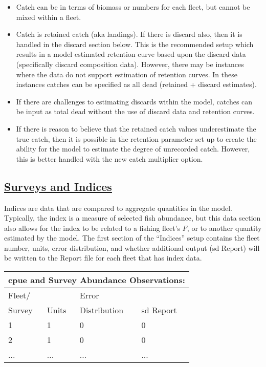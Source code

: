 \begin{itemize}
	\item Catch can be in terms of biomass or numbers for each fleet, but cannot be mixed within a fleet.
	\item Catch is retained catch (aka landings). If there is discard also, then it is handled in the discard section below. This is the recommended setup which results in a model estimated retention curve based upon the discard data (specifically discard composition data). However, there may be instances where the data do not support estimation of retention curves. In these instances catches can be specified as all dead (retained + discard estimates).
	\item If there are challenges to estimating discards within the model, catches can be input as total dead without the use of discard data and retention curves.
	\item If there is reason to believe that the retained catch values underestimate the true catch, then it is possible in the retention parameter set up to create the ability for the model to estimate the degree of unrecorded catch. However, this is better handled with the new catch multiplier option.
\end{itemize}

\hypertarget{SurveysIndices}{}
\subsection[Surveys and Indices]{\protect\hyperlink{SurveysIndices}{Surveys and Indices}}
Indices are data that are compared to aggregate quantities in the model. Typically, the index is a measure of selected fish abundance, but this data section also allows for the index to be related to a fishing fleet's $F$, or to another quantity estimated by the model. The first section of the ``Indices'' setup contains the fleet number, units, error distribution, and whether additional output (\gls{sd} Report) will be written to the Report file for each fleet that has index data.

\begin{center}
	\begin{tabular}{p{3cm} p{3cm} p{4cm} p{4cm}}
		\multicolumn{4}{l}{\gls{cpue} and Survey Abundance Observations:} \\
		\hline
		Fleet/ &       & Error        & \Tstrut\\
		Survey & Units & Distribution & \gls{sd} Report \Bstrut\\
		\hline
		1 & 1 & 0 & 0 \Tstrut\\
		2 & 1 & 0 & 0 \\
		... & ... & ... & ... \Bstrut\\
		\hline
	\end{tabular}		
\end{center}



